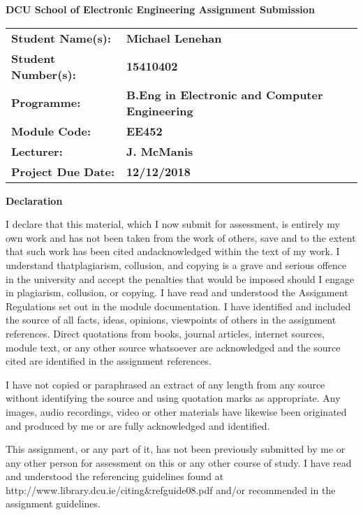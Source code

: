 \documentclass[12pt,a4paper]{scrartcl}
\begin{document}
\begin{titlepage}
  \begin{center}
    \vspace{1cm}
    {\Large\textbf{DCU School of Electronic Engineering Assignment Submission}}

    \vspace{0.5cm}
    \begin{tabu}{ X[l] X[2l] }
      \textbf{Student Name(s):} & \textbf{Michael Lenehan} \\
      \textbf{Student Number(s):} & \textbf{15410402} \\
      \textbf{Programme:} & \textbf{B.Eng in Electronic and Computer Engineering} \\
      \textbf{Module Code:} & \textbf{EE452} \\
      \textbf{Lecturer:} & \textbf{J. McManis} \\    
      \textbf{Project Due Date:} & \textbf{12/12/2018}
    \end{tabu}

    \vspace{0.5cm}
    \textbf{Declaration}
 \end{center}
    \begin{bfseries}
    I declare that this material, which I now submit for assessment, is entirely
    my own work and has not been taken from the work of others, save and to the
    extent that such work has been cited andacknowledged within the text of my
    work. I understand thatplagiarism, collusion, and copying is a grave and
    serious offence in the university and accept the penalties that would be
    imposed should I engage in plagiarism, collusion, or copying. I have read
    and understood the Assignment Regulations set out in the module documentation.
    I have identified and included the source of all facts, ideas, opinions,
    viewpoints of others in the assignment references. Direct quotations from
    books, journal articles, internet sources, module text, or any other source
    whatsoever are acknowledged and the source cited are identified in the
    assignment references. 
    
    I have not copied or paraphrased an extract of any
    length from any source without identifying the source and using quotation
    marks as appropriate. Any images, audio recordings, video or other materials
    have likewise been originated and produced by me or are fully acknowledged
    and identified.
    
    This assignment, or any part of it, has not been previously
    submitted by me or any other person for assessment on this or any other 
    course of study. I have read and understood the referencing guidelines found
    at http://www.library.dcu.ie/citing\&refguide08.pdf and/or recommended in the
    assignment guidelines. 
    

\end{bfseries}
\end{titlepage}
\end{document}
